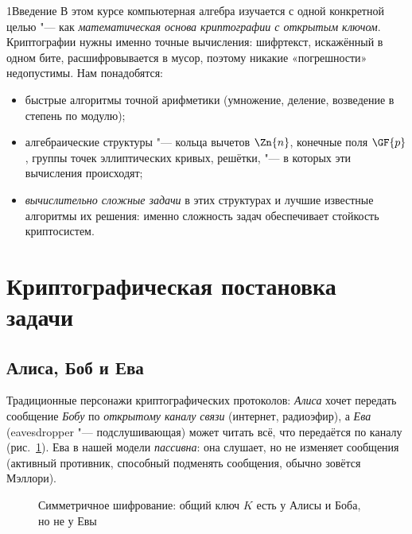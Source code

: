 \begin{lecture}{1}{Введение}
В этом курсе компьютерная алгебра изучается с одной конкретной целью "--- как
\emph{математическая основа криптографии с открытым ключом}. Криптографии нужны именно точные
вычисления: шифртекст, искажённый в одном бите, расшифровывается в мусор, поэтому никакие
«погрешности» недопустимы. Нам понадобятся:
\begin{itemize}
  \item быстрые алгоритмы точной арифметики (умножение, деление, возведение в степень по модулю);
  \item алгебраические структуры "--- кольца вычетов $\Zn{n}$, конечные поля $\GF{p}$, группы
    точек эллиптических кривых, решётки, "--- в которых эти вычисления происходят;
  \item \emph{вычислительно сложные задачи} в этих структурах и лучшие известные алгоритмы их
    решения: именно сложность задач обеспечивает стойкость криптосистем.
\end{itemize}


\section{Криптографическая постановка задачи}

\subsection{Алиса, Боб и Ева}

Традиционные персонажи криптографических протоколов: \emph{Алиса} хочет передать сообщение
\emph{Бобу} по \emph{открытому каналу связи} (интернет, радиоэфир), а \emph{Ева}
(eavesdropper "--- подслушивающая) может читать всё, что передаётся по каналу
(рис.~\ref{l1:fig-channel}). Ева в нашей модели \emph{пассивна}: она слушает, но не изменяет
сообщения (активный противник, способный подменять сообщения, обычно зовётся Мэллори).

\begin{figure}[ht]
\centering
{}
\caption{Симметричное шифрование: общий ключ $K$ есть у Алисы и Боба, но не у Евы}
\label{l1:fig-channel}
\end{figure}


\end{lecture}
